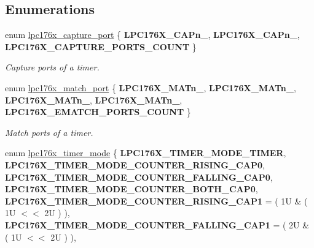 \subsection*{Enumerations}
\begin{DoxyCompactItemize}
\item 
enum \mbox{\hyperlink{timer-defs_8h_ae5e651b1ca96b94e336b80de49384221}{lpc176x\+\_\+capture\+\_\+port}} \{ {\bfseries L\+P\+C176\+X\+\_\+\+C\+A\+Pn\+\_}, 
{\bfseries L\+P\+C176\+X\+\_\+\+C\+A\+Pn\+\_}, 
{\bfseries L\+P\+C176\+X\+\_\+\+C\+A\+P\+T\+U\+R\+E\+\_\+\+P\+O\+R\+T\+S\+\_\+\+C\+O\+U\+NT}
 \}
\begin{DoxyCompactList}\small\item\em Capture ports of a timer. \end{DoxyCompactList}\item 
enum \mbox{\hyperlink{timer-defs_8h_a675d64238cc0f91f70dcb731e2f33d83}{lpc176x\+\_\+match\+\_\+port}} \{ \newline
{\bfseries L\+P\+C176\+X\+\_\+\+M\+A\+Tn\+\_}, 
{\bfseries L\+P\+C176\+X\+\_\+\+M\+A\+Tn\+\_}, 
{\bfseries L\+P\+C176\+X\+\_\+\+M\+A\+Tn\+\_}, 
{\bfseries L\+P\+C176\+X\+\_\+\+M\+A\+Tn\+\_}, 
\newline
{\bfseries L\+P\+C176\+X\+\_\+\+E\+M\+A\+T\+C\+H\+\_\+\+P\+O\+R\+T\+S\+\_\+\+C\+O\+U\+NT}
 \}
\begin{DoxyCompactList}\small\item\em Match ports of a timer. \end{DoxyCompactList}\item 
enum \mbox{\hyperlink{timer-defs_8h_ab87d5565db3afd3f1ad7b2762ab600b9}{lpc176x\+\_\+timer\+\_\+mode}} \{ \newline
{\bfseries L\+P\+C176\+X\+\_\+\+T\+I\+M\+E\+R\+\_\+\+M\+O\+D\+E\+\_\+\+T\+I\+M\+ER}, 
{\bfseries L\+P\+C176\+X\+\_\+\+T\+I\+M\+E\+R\+\_\+\+M\+O\+D\+E\+\_\+\+C\+O\+U\+N\+T\+E\+R\+\_\+\+R\+I\+S\+I\+N\+G\+\_\+\+C\+A\+P0}, 
{\bfseries L\+P\+C176\+X\+\_\+\+T\+I\+M\+E\+R\+\_\+\+M\+O\+D\+E\+\_\+\+C\+O\+U\+N\+T\+E\+R\+\_\+\+F\+A\+L\+L\+I\+N\+G\+\_\+\+C\+A\+P0}, 
{\bfseries L\+P\+C176\+X\+\_\+\+T\+I\+M\+E\+R\+\_\+\+M\+O\+D\+E\+\_\+\+C\+O\+U\+N\+T\+E\+R\+\_\+\+B\+O\+T\+H\+\_\+\+C\+A\+P0}, 
\newline
{\bfseries L\+P\+C176\+X\+\_\+\+T\+I\+M\+E\+R\+\_\+\+M\+O\+D\+E\+\_\+\+C\+O\+U\+N\+T\+E\+R\+\_\+\+R\+I\+S\+I\+N\+G\+\_\+\+C\+A\+P1} = ( 1U \& ( 1U $<$$<$ 2U ) ), 
{\bfseries L\+P\+C176\+X\+\_\+\+T\+I\+M\+E\+R\+\_\+\+M\+O\+D\+E\+\_\+\+C\+O\+U\+N\+T\+E\+R\+\_\+\+F\+A\+L\+L\+I\+N\+G\+\_\+\+C\+A\+P1} = ( 2U \& ( 1U $<$$<$ 2U ) ), 

\end{DoxyCompactItemize}
